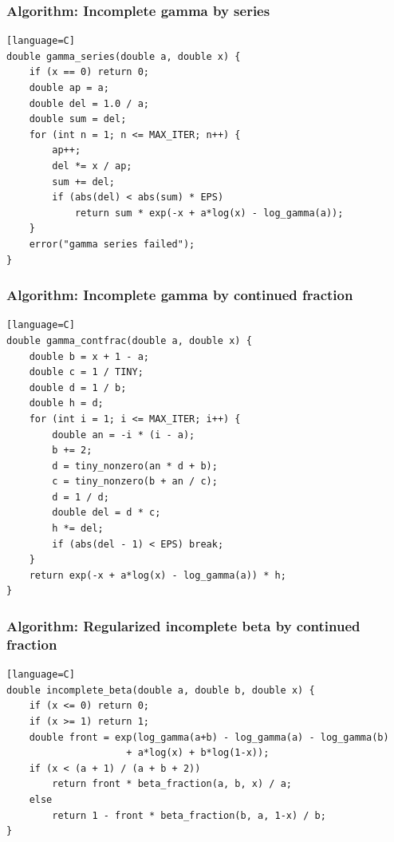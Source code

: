 \documentclass[11pt]{article}
\begin{document}
\subsubsection{Algorithm: Incomplete gamma by series}\label{algorithm-incomplete-gamma-by-series}

\begin{verbatim}[language=C]
double gamma_series(double a, double x) {
    if (x == 0) return 0;
    double ap = a;
    double del = 1.0 / a;
    double sum = del;
    for (int n = 1; n <= MAX_ITER; n++) {
        ap++;
        del *= x / ap;
        sum += del;
        if (abs(del) < abs(sum) * EPS)
            return sum * exp(-x + a*log(x) - log_gamma(a));
    }
    error("gamma series failed");
}
\end{verbatim}

\subsubsection{Algorithm: Incomplete gamma by continued fraction}\label{algorithm-incomplete-gamma-by-continued-fraction}

\begin{verbatim}[language=C]
double gamma_contfrac(double a, double x) {
    double b = x + 1 - a;
    double c = 1 / TINY;
    double d = 1 / b;
    double h = d;
    for (int i = 1; i <= MAX_ITER; i++) {
        double an = -i * (i - a);
        b += 2;
        d = tiny_nonzero(an * d + b);
        c = tiny_nonzero(b + an / c);
        d = 1 / d;
        double del = d * c;
        h *= del;
        if (abs(del - 1) < EPS) break;
    }
    return exp(-x + a*log(x) - log_gamma(a)) * h;
}
\end{verbatim}

\subsubsection{Algorithm: Regularized incomplete beta by continued fraction}\label{algorithm-regularized-incomplete-beta-by-continued-fraction}

\begin{verbatim}[language=C]
double incomplete_beta(double a, double b, double x) {
    if (x <= 0) return 0;
    if (x >= 1) return 1;
    double front = exp(log_gamma(a+b) - log_gamma(a) - log_gamma(b)
                     + a*log(x) + b*log(1-x));
    if (x < (a + 1) / (a + b + 2))
        return front * beta_fraction(a, b, x) / a;
    else
        return 1 - front * beta_fraction(b, a, 1-x) / b;
}
\end{verbatim}
\end{document}
